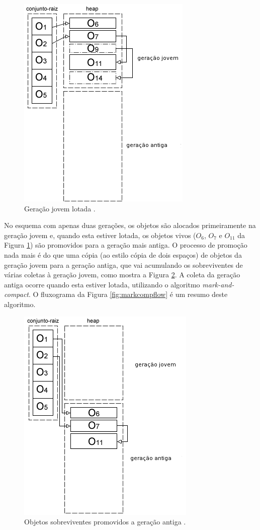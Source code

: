 \documentclass[ccc, pg2]{esinucpel}
\begin{document}
\begin{figure}[h]
\centering
\includegraphics[scale=.55]{images/gen_young.png}
\caption{Geração jovem lotada \cite{bib:marcos}.}
\label{fig:genyoung}
\end{figure}

No esquema com apenas duas gerações, os objetos são alocados primeiramente na geração jovem e, quando esta estiver lotada, os objetos vivos ($O_6$, $O_7$ e $O_{11}$ da Figura \ref{fig:genyoung}) são promovidos para a geração mais antiga. O processo de promoção nada mais é do que uma cópia (ao estilo cópia de dois espaços) de objetos da geração jovem para a geração antiga, que vai acumulando os sobreviventes de várias coletas à geração jovem, como mostra a Figura \ref{fig:genpromot}. A coleta da geração antiga ocorre quando esta estiver lotada, utilizando o algoritmo \textit{mark-and-compact}. O fluxograma da Figura \ref{fig:markcompflow} é um resumo deste algoritmo.%


\begin{figure}[h]
\centering
\includegraphics[scale=.55]{images/gen_promot.png}
\caption{Objetos sobreviventes promovidos a geração antiga \cite{bib:marcos}.}
\label{fig:genpromot}
\end{figure}
\end{document}
